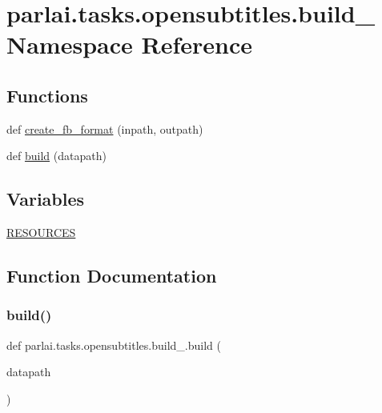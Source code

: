 \hypertarget{namespaceparlai_1_1tasks_1_1opensubtitles_1_1build__2009}{}\section{parlai.\+tasks.\+opensubtitles.\+build\+\_ Namespace Reference}
\label{namespaceparlai_1_1tasks_1_1opensubtitles_1_1build__2009}
\subsection*{Functions}
\begin{DoxyCompactItemize}
\item 
def \hyperlink{namespaceparlai_1_1tasks_1_1opensubtitles_1_1build__2009_ad149abe80311061e9b055102702633ed}{create\+\_\+fb\+\_\+format} (inpath, outpath)
\item 
def \hyperlink{namespaceparlai_1_1tasks_1_1opensubtitles_1_1build__2009_a1b4aedcfe5cf20f4708277aba234e048}{build} (datapath)
\end{DoxyCompactItemize}
\subsection*{Variables}
\begin{DoxyCompactItemize}
\item 
\hyperlink{namespaceparlai_1_1tasks_1_1opensubtitles_1_1build__2009_a850120232d120b52f2bef60aa580e398}{R\+E\+S\+O\+U\+R\+C\+ES}
\end{DoxyCompactItemize}


\subsection{Function Documentation}
\mbox{\label{namespaceparlai_1_1tasks_1_1opensubtitles_1_1build__2009_a1b4aedcfe5cf20f4708277aba234e048}} 
\subsubsection{\texorpdfstring{build()}{build()}}
{\footnotesize\ttfamily def parlai.\+tasks.\+opensubtitles.\+build\+\_.\+build (\begin{DoxyParamCaption}\item[{}]{datapath }\end{DoxyParamCaption})}



